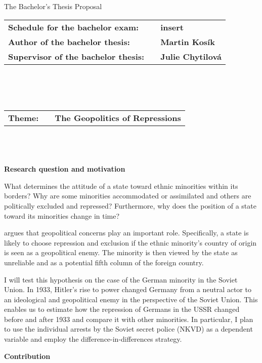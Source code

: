 \pagestyle{empty}
\begin{center}
\LARGE{The Bachelor’s Thesis Proposal}
\end{center}
\vspace{5mm}
\begin{tabular}{lcl}
\large{\bf Schedule for the bachelor exam:} & & \large{\bf insert}\\
\large{\bf Author of the bachelor thesis:} & & \large{\bf Martin Kosík}\\
\large{\bf Supervisor of the bachelor thesis:} & & \large{\bf Julie Chytilová}
\end{tabular}
\\
\\
\\
\begin{tabular}{lcl}
\large{\bf Theme:} & & \large{\bf The Geopolitics of Repressions}
\end{tabular}\\
\\
\\
\large{\bf Research question and motivation}

\noindent
What determines the attitude of a state toward ethnic minorities within its borders? Why are some minorities accommodated or assimilated and others are politically excluded and repressed? Furthermore, why does the position of a state toward its minorities change in time? 

\citet{mylonas_politics_2013} argues that geopolitical concerns play an important role. Specifically, a state is likely to choose repression and exclusion if the ethnic minority's country of origin is seen as a geopolitical enemy. The minority is then viewed by the state as unreliable and as a potential fifth column of the foreign country. 

I will test this hypothesis on the case of the German minority in the Soviet Union. In 1933, Hitler’s rise to power changed Germany from a neutral actor to an ideological and geopolitical enemy in the perspective of the Soviet Union. This enables us to estimate how the repression of Germans in the USSR changed before and after 1933 and compare it with other minorities. In particular, I plan to use the individual arrests by the Soviet secret police (NKVD) as a dependent variable and employ the difference-in-differences strategy. 

\noindent  \large{\bf Contribution}

